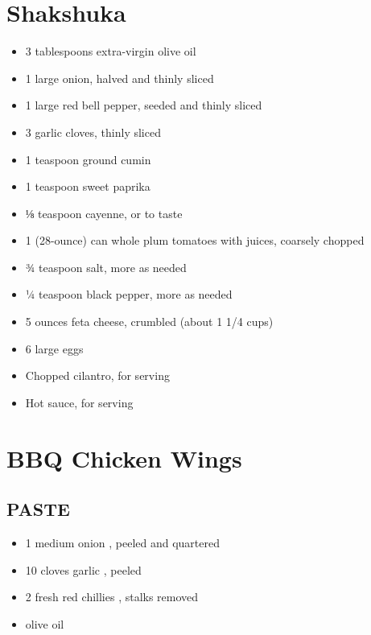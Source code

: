 \documentclass[]{article}
\providecommand{\tightlist}{%
  \setlength{\itemsep}{0pt}\setlength{\parskip}{0pt}}
\begin{document}
\hypertarget{shakshuka}{%
\section{Shakshuka}\label{shakshuka}}

\begin{itemize}
\tightlist
\item
  3 tablespoons extra-virgin olive oil
\item
  1 large onion, halved and thinly sliced
\item
  1 large red bell pepper, seeded and thinly sliced
\item
  3 garlic cloves, thinly sliced
\item
  1 teaspoon ground cumin
\item
  1 teaspoon sweet paprika
\item
  ⅛ teaspoon cayenne, or to taste
\item
  1 (28-ounce) can whole plum tomatoes with juices, coarsely chopped
\item
  ¾ teaspoon salt, more as needed
\item
  ¼ teaspoon black pepper, more as needed
\item
  5 ounces feta cheese, crumbled (about 1 1/4 cups)
\item
  6 large eggs
\item
  Chopped cilantro, for serving
\item
  Hot sauce, for serving
\end{itemize}

\hypertarget{bbq-chicken-wings}{%
\section{BBQ Chicken Wings}\label{bbq-chicken-wings}}

\hypertarget{paste}{%
\subsection{PASTE}\label{paste}}

\begin{itemize}
\tightlist
\item
  1 medium onion , peeled and quartered
\item
  10 cloves garlic , peeled
\item
  2 fresh red chillies , stalks removed
\item
  olive oil
\end{itemize}
\end{document}
